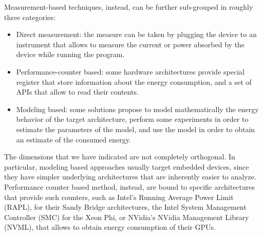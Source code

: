 Measurement-based techniques, instead, can be further sub-grouped in roughly three categories:
\begin{itemize}
\item Direct measurement: the measure can be taken by plugging the device to an instrument that allows to measure the current or power absorbed by the device while running the program.
\item Performance-counter based: some hardware architectures provide special register that store information about the energy consumption, and a set of APIs that allow to read their contents.
\item Modeling based: some solutions propose to model mathematically the energy behavior of the target architecture, perform some experiments in order to estimate the parameters of the model, and use the model in order to obtain an estimate of the consumed energy.
\end{itemize} 
\par The dimensions that we have indicated are not completely orthogonal. In particular, modeling based approaches usually target embedded devices, since they have simpler underlying architectures that are inherently easier to analyze. \newline Performance counter based method, instead, are bound to specific architectures that provide such counters, such as Intel's Running Average Power Limit (RAPL), for their Sandy Bridge architectures, the Intel System Management Controller (SMC) for the Xeon Phi, or NVidia's NVidia Management Library (NVML), that allows to obtain energy consumption of their GPUs.

